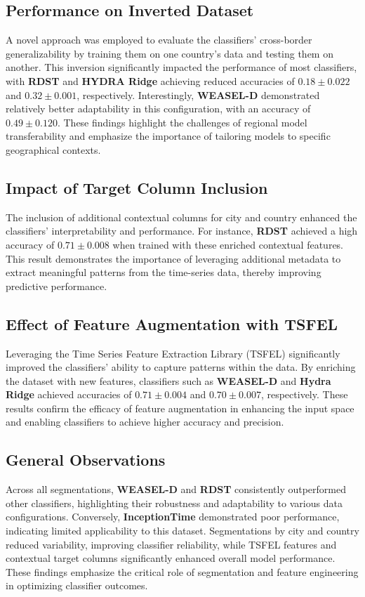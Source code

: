 \documentclass{ieeeaccess}
\begin{document}
\subsection{Performance on Inverted Dataset}
A novel approach was employed to evaluate the classifiers' cross-border generalizability by training them on one country's data and testing them on another. This inversion significantly impacted the performance of most classifiers, with \textbf{RDST} and \textbf{HYDRA Ridge} achieving reduced accuracies of \(0.18 \pm 0.022\) and \(0.32 \pm 0.001\), respectively. Interestingly, \textbf{WEASEL-D} demonstrated relatively better adaptability in this configuration, with an accuracy of \(0.49 \pm 0.120\). These findings highlight the challenges of regional model transferability and emphasize the importance of tailoring models to specific geographical contexts.

\subsection{Impact of Target Column Inclusion}
The inclusion of additional contextual columns for city and country enhanced the classifiers' interpretability and performance. For instance, \textbf{RDST} achieved a high accuracy of \(0.71 \pm 0.008\) when trained with these enriched contextual features. This result demonstrates the importance of leveraging additional metadata to extract meaningful patterns from the time-series data, thereby improving predictive performance.

\subsection{Effect of Feature Augmentation with TSFEL}
Leveraging the Time Series Feature Extraction Library (TSFEL) significantly improved the classifiers' ability to capture patterns within the data. By enriching the dataset with new features, classifiers such as \textbf{WEASEL-D} and \textbf{Hydra Ridge} achieved accuracies of \(0.71 \pm 0.004\) and \(0.70 \pm 0.007\), respectively. These results confirm the efficacy of feature augmentation in enhancing the input space and enabling classifiers to achieve higher accuracy and precision.

\subsection{General Observations}
Across all segmentations, \textbf{WEASEL-D} and \textbf{RDST} consistently outperformed other classifiers, highlighting their robustness and adaptability to various data configurations. Conversely, \textbf{InceptionTime} demonstrated poor performance, indicating limited applicability to this dataset. Segmentations by city and country reduced variability, improving classifier reliability, while TSFEL features and contextual target columns significantly enhanced overall model performance. These findings emphasize the critical role of segmentation and feature engineering in optimizing classifier outcomes.
\end{document}
